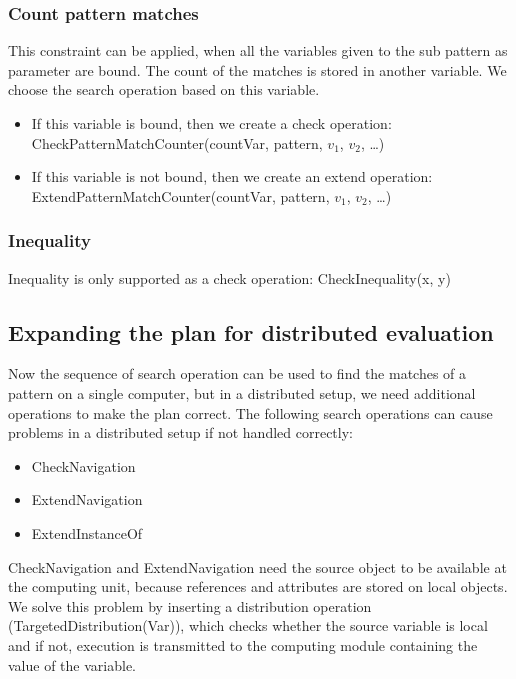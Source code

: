 \subsubsection{Count pattern matches}

This constraint can be applied, when all the variables given to the sub pattern as parameter are bound. 
The count of the matches is stored in another variable. 
We choose the search operation based on this variable.

\begin{itemize}
	\item If this variable is bound, then we create a check operation: 
	\newline CheckPatternMatchCounter(countVar, pattern, $v_1$, $v_2$, \dots{})
	\item If this variable is not bound, then we create an extend operation: 
	\newline ExtendPatternMatchCounter(countVar, pattern, $v_1$, $v_2$, \dots{})
\end{itemize}


\subsubsection{Inequality}
Inequality is only supported as a check operation:
\newline CheckInequality(x, y)


\subsection{Expanding the plan for distributed evaluation}
Now the sequence of search operation can be used to find the matches of a pattern on a single computer, but in a distributed setup, we need additional operations to make the plan correct.
The following search operations can cause problems in a distributed setup if not handled correctly:
\begin{itemize}
	\item CheckNavigation	
	\item ExtendNavigation
	\item ExtendInstanceOf
\end{itemize}

CheckNavigation and ExtendNavigation need the source object to be available at the computing unit, because references and attributes are stored on local objects.
We solve this problem by inserting a distribution operation (TargetedDistribution(Var)), which checks whether the source variable is local and if not, execution is transmitted to the computing module containing the value of the variable.

